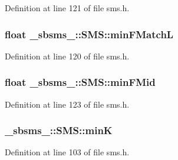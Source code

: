 Definition at line 121 of file sms.\+h.

\subsubsection[{\texorpdfstring{min\+F\+MatchL}{minFMatchL}}]{\setlength{\rightskip}{0pt plus 5cm}float \+\_\+sbsms\+\_\+\+::\+S\+M\+S\+::min\+F\+MatchL\hspace{0.3cm}{\ttfamily [protected]}}\hypertarget{class__sbsms___1_1_s_m_s_ae2acc271c35b11122eeeb6bdb45566dd}{}\label{class__sbsms___1_1_s_m_s_ae2acc271c35b11122eeeb6bdb45566dd}


Definition at line 120 of file sms.\+h.

\subsubsection[{\texorpdfstring{min\+F\+Mid}{minFMid}}]{\setlength{\rightskip}{0pt plus 5cm}float \+\_\+sbsms\+\_\+\+::\+S\+M\+S\+::min\+F\+Mid\hspace{0.3cm}{\ttfamily [protected]}}\hypertarget{class__sbsms___1_1_s_m_s_ae372780cfb230946c28e034fc2c0e0cd}{}\label{class__sbsms___1_1_s_m_s_ae372780cfb230946c28e034fc2c0e0cd}


Definition at line 123 of file sms.\+h.

\subsubsection[{\texorpdfstring{minK}{minK}}]{ \+\_\+sbsms\+\_\+\+::\+S\+M\+S\+::minK\hspace{0.3cm}{\ttfamily [protected]}}\hypertarget{class__sbsms___1_1_s_m_s_afdce36212b7f4ed68bddfca463ab1467}{}\label{class__sbsms___1_1_s_m_s_afdce36212b7f4ed68bddfca463ab1467}


Definition at line 103 of file sms.\+h.


